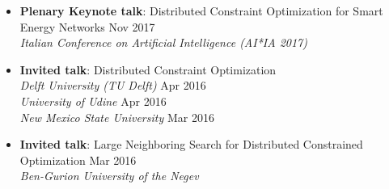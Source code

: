 \begin{itemize}
	\item {\bf Plenary Keynote talk}: Distributed Constraint Optimization for Smart Energy Networks \hfill {Nov 2017}\\
    {\em Italian Conference on Artificial Intelligence (AI*IA 2017)}
	

	\item {\bf Invited talk}: Distributed Constraint Optimization\\
	{\em Delft University (TU Delft)} \hfill {Apr 2016}\\
 	{\em University of Udine} \hfill {Apr 2016} \\ 
	{\em New Mexico State University} \hfill {Mar 2016}
	
	\item {\bf Invited talk}: Large Neighboring Search for Distributed Constrained Optimization \hfill {Mar 2016}\\
	{\em Ben-Gurion University of the Negev}
\end{itemize}
